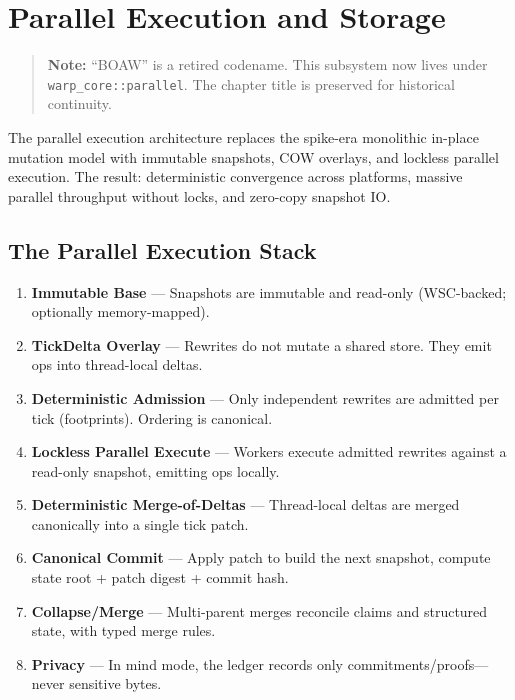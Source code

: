 
\chapter{Parallel Execution and Storage}
\label{chap:boaw}

\begin{quote}
\textbf{Note:} ``BOAW'' is a retired codename. This subsystem now lives under
\texttt{warp\_core::parallel}. The chapter title is preserved for historical
continuity.
\end{quote}

The parallel execution architecture replaces the spike-era monolithic in-place mutation model with immutable snapshots, COW overlays, and lockless parallel execution. The result: deterministic convergence across platforms, massive parallel throughput without locks, and zero-copy snapshot IO.

\section{The Parallel Execution Stack}

\begin{enumerate}
    \item \textbf{Immutable Base} --- Snapshots are immutable and read-only (WSC-backed; optionally memory-mapped).
    \item \textbf{TickDelta Overlay} --- Rewrites do not mutate a shared store. They emit ops into thread-local deltas.
    \item \textbf{Deterministic Admission} --- Only independent rewrites are admitted per tick (footprints). Ordering is canonical.
    \item \textbf{Lockless Parallel Execute} --- Workers execute admitted rewrites against a read-only snapshot, emitting ops locally.
    \item \textbf{Deterministic Merge-of-Deltas} --- Thread-local deltas are merged canonically into a single tick patch.
    \item \textbf{Canonical Commit} --- Apply patch to build the next snapshot, compute state root + patch digest + commit hash.
    \item \textbf{Collapse/Merge} --- Multi-parent merges reconcile claims and structured state, with typed merge rules.
    \item \textbf{Privacy} --- In mind mode, the ledger records only commitments/proofs---never sensitive bytes.
\end{enumerate}

